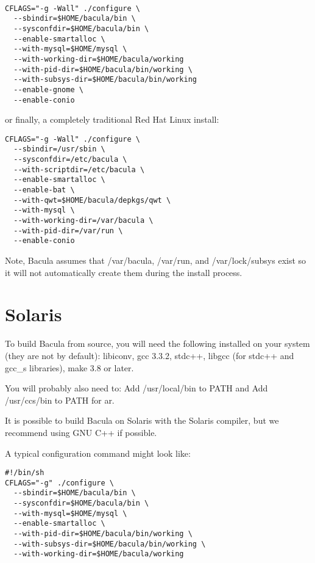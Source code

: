 \footnotesize
\begin{verbatim}
 
CFLAGS="-g -Wall" ./configure \
  --sbindir=$HOME/bacula/bin \
  --sysconfdir=$HOME/bacula/bin \
  --enable-smartalloc \
  --with-mysql=$HOME/mysql \
  --with-working-dir=$HOME/bacula/working
  --with-pid-dir=$HOME/bacula/bin/working \
  --with-subsys-dir=$HOME/bacula/bin/working
  --enable-gnome \
  --enable-conio
\end{verbatim}
\normalsize

or finally, a completely traditional Red Hat Linux install: 

\footnotesize
\begin{verbatim}
CFLAGS="-g -Wall" ./configure \
  --sbindir=/usr/sbin \
  --sysconfdir=/etc/bacula \
  --with-scriptdir=/etc/bacula \
  --enable-smartalloc \
  --enable-bat \
  --with-qwt=$HOME/bacula/depkgs/qwt \
  --with-mysql \
  --with-working-dir=/var/bacula \
  --with-pid-dir=/var/run \
  --enable-conio
\end{verbatim}
\normalsize

Note, Bacula assumes that /var/bacula, /var/run, and /var/lock/subsys exist so
it will not automatically create them during the install process. 

\section{Solaris}
\index[general]{Solaris}

To build Bacula from source, you will need the following installed on your
system (they are not by default): libiconv, gcc 3.3.2, stdc++, libgcc (for
stdc++ and gcc\_s libraries), make 3.8 or later. 

You will probably also need to: Add /usr/local/bin to PATH and Add
/usr/ccs/bin to PATH for ar. 

It is possible to build Bacula on Solaris with the Solaris compiler, but
we recommend using GNU C++ if possible.  

A typical configuration command might look like:

\footnotesize
\begin{verbatim}
#!/bin/sh
CFLAGS="-g" ./configure \
  --sbindir=$HOME/bacula/bin \
  --sysconfdir=$HOME/bacula/bin \
  --with-mysql=$HOME/mysql \
  --enable-smartalloc \
  --with-pid-dir=$HOME/bacula/bin/working \
  --with-subsys-dir=$HOME/bacula/bin/working \
  --with-working-dir=$HOME/bacula/working
\end{verbatim}
\normalsize

